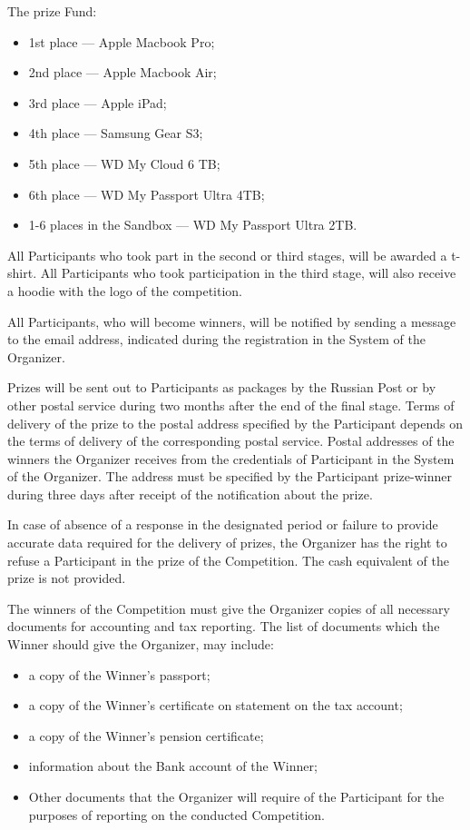 The prize Fund:
\begin{itemize}
\item 1st place --- Apple Macbook Pro;
\item 2nd place --- Apple Macbook Air;
\item 3rd place --- Apple iPad;
\item 4th place --- Samsung Gear S3;
\item 5th place --- WD My Cloud 6 TB;
\item 6th place --- WD My Passport Ultra 4TB;
\item 1-6 places in the Sandbox --- WD My Passport Ultra 2TB.
\end{itemize}

All Participants who took part in the second or third stages, will be awarded a t-shirt. All Participants 
who took participation in the third stage, will also receive a hoodie with the logo of the competition.

All Participants, who will become winners, will be notified by sending a message to the email address,
indicated during the registration in the System of the Organizer.

Prizes will be sent out to Participants as packages by the Russian Post or by other postal service during two months after the end 
of the final stage. Terms of delivery of the prize to the postal address specified by the Participant depends on the terms of
delivery of the corresponding postal service. Postal addresses of the winners the Organizer receives from the credentials of Participant
in the System of the Organizer. The address must be specified by the Participant prize-winner during
three days after receipt of the notification about the prize.

In case of absence of a response in the designated period or failure to provide accurate data required for the delivery of prizes, the Organizer
has the right to refuse a Participant in the prize of the Competition. The cash equivalent of the prize is not provided.
 
The winners of the Competition must give the Organizer copies of all necessary documents for accounting and tax reporting. 
The list of documents which the Winner should give the Organizer, may include:
\begin{itemize}
\item a copy of the Winner’s passport;
\item a copy of the Winner’s certificate on statement on the tax account;
\item a copy of the Winner’s pension certificate;
\item information about the Bank account of the Winner;
\item Other documents that the Organizer will require of the Participant for the purposes of reporting on the conducted Competition.
\end{itemize}

